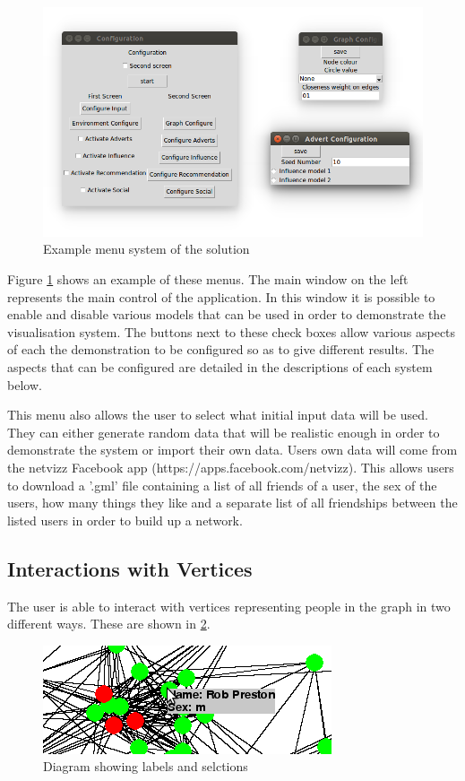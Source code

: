 \documentclass[12pt,a4paper]{article}
\begin{document}
\begin{figure}[htb]
\centering
\caption{Example menu system of the solution}
\label{fig:menu}
\includegraphics[scale=0.5]{MenuShot.png}
\end{figure}

Figure \ref{fig:menu} shows an example of these menus. The main window on the left represents the main control of the application. In this window it is possible to enable and disable various models that can be used in order to demonstrate the visualisation system. The buttons next to these check boxes allow various aspects of each the demonstration to be configured so as to give different results. The aspects that can be configured are detailed in the descriptions of each system below.

This menu also allows the user to select what initial input data will be used. They can either generate random data that will be realistic enough in order to demonstrate the system or import their own data. Users own data will come from the netvizz Facebook app (https://apps.facebook.com/netvizz). This allows users to download a '.gml' file containing a list of all friends of a user, the sex of the users, how many things they like and a separate list of all friendships between the listed users in order to build up a network.

\subsection{Interactions with Vertices}

The user is able to interact with vertices representing people in the graph in two different ways. These are shown in \ref{fig:labels}.

\begin{figure}[htb]
\centering
\caption{Diagram showing labels and selctions}
\label{fig:labels}
\includegraphics[scale=1]{Select.png}
\end{figure}
\end{document}
